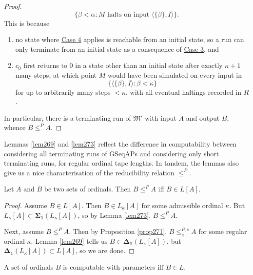 \documentclass[12pt]{article}
\numberwithin{equation}{section}
\begin{document}
\begin{proof}
\begin{equation*}
    \{\beta < \alpha : M \text{ halts on input } \langle \{\beta\}, I \rangle\} \text{.}
\end{equation*}This is because
\begin{enumerate}[label=(\arabic*)]
    \item no state where \hyperref[8340c4]{Case 4} applies is reachable from an initial state, so a run can only terminate from an initial state as a consequence of \hyperref[8340c3]{Case 3}, and
    \item $c_0$ first returns to $0$ in a state other than an initial state after exactly $\kappa + 1$ many steps, at which point $M$ would have been simulated on every input in 
    \begin{equation*}
        \{\langle \{\beta\}, I \rangle : \beta < \kappa\}
    \end{equation*}
    for up to arbitrarily many steps $< \kappa$, with all eventual haltings recorded in $R$.
\end{enumerate}
In particular, there is a terminating run of $\mathfrak{M}'$ with input $A$ and output $B$, whence $B \leq^P A$.
\end{proof}

Lemmas \ref{lem269} and \ref{lem273} reflect the difference in computability between considering all terminating runs of GSeqAPs and considering only short terminating runs, for regular ordinal tape lengths. In tandem, the lemmas also give us a nice characterisation of the reducibility relation $\leq^P$.

\begin{thm}\label{thm275}
Let $A$ and $B$ be two sets of ordinals. Then $B \leq^P A$ iff $B \in L[A]$.
\end{thm}

\begin{proof}
Assume $B \in L[A]$. Then $B \in L_{\kappa}[A]$ for some admissible ordinal $\kappa$. But $L_{\kappa}[A] \subset \mathbf{\Sigma_1}(L_{\kappa}[A])$, so by Lemma \ref{lem273}, $B \leq^P A$. 

Next, assume $B \leq^P A$. Then by Proposition \ref{prop271}, $B \leq^{P, s}_{\kappa} A$ for some regular ordinal $\kappa$. Lemma \ref{lem269} tells us $B \in \mathbf{\Delta_1}(L_{\kappa}[A])$, but $\mathbf{\Delta_1}(L_{\kappa}[A]) \subset L[A]$, so we are done.
\end{proof}

\begin{cor}
A set of ordinals $B$ is computable with parameters iff $B \in L$.
\end{cor}
\end{document}
